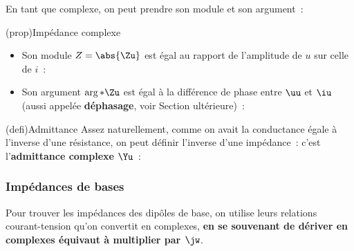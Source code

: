 \documentclass[../../main/main.tex]{subfiles}
\begin{document}
En tant que complexe, on peut prendre son module et son argument~:
\begin{tcb}(prop){Impédance complexe}
	\begin{itemize}
		\item Son module $Z = \abs{\Zu}$ est égal au rapport de
		      l'amplitude de $u$ sur celle de $i$~:
		      \psw{%
			      \[
				      \boxed{ \abs{\Zu}
					      = \frac{\abs{\uu}}{\abs{\iu}}
					      = \frac{U}{I}
				      }%
			      \]
		      }%
		\item Son argument $\arg*{\Zu}$ est égal à la différence de phase entre
		      $\uu$ et $\iu$ (aussi appelée \textbf{déphasage}, voir Section
		      ultérieure)~:
		      \psw{%
			      \[
				      \boxed{\arg*{\Zu}
					      = \arg*{ \frac{\uu}{\iu} }%
					      = \f_u - \f_i}
			      \]
		      }%
	\end{itemize}
\end{tcb}


\begin{tcb}(defi){Admittance}
	Assez naturellement, comme on avait la conductance égale à l'inverse d'une
	résistance, on peut définir l'inverse d'une impédance~: c'est
	l'\textbf{admittance complexe} $\Yu$~:
	\psw{%
		\[
			\boxed{\Yu
				= \frac{1}{\Zu} \Rightarrow \Iu
				= \Yu\times\Uu}
		\]
	}%
\end{tcb}

\subsubsection{Impédances de bases}

Pour trouver les impédances des dipôles de base, on utilise leurs relations
courant-tension qu'on convertit en complexes, \textbf{en se souvenant de dériver
	en complexes équivaut à multiplier par $\jw$}.
\end{document}
